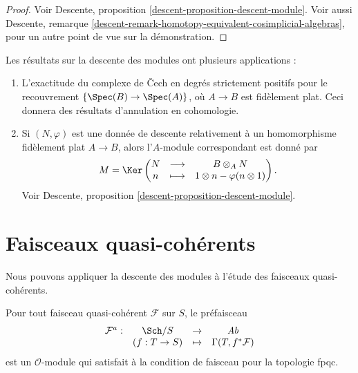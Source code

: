 \begin{proof}
Voir
Descente, proposition \ref{descent-proposition-descent-module}.
Voir aussi
Descente, remarque \ref{descent-remark-homotopy-equivalent-cosimplicial-algebras},
pour un autre point de vue sur la d\'emonstration.
\end{proof}

\begin{remarks}
\label{remarks-theorem-modules-exactness}
Les r\'esultats sur la descente des modules ont plusieurs applications :
\begin{enumerate}
\item L'exactitude du complexe de {\v C}ech en degr\'es strictement positifs pour
le recouvrement $\{\Spec(B) \to \Spec(A)\}$, o\`u $A \to B$ est
fid\`element plat. Ceci donnera des r\'esultats d'annulation en cohomologie.
\item Si $(N, \varphi)$ est une donn\'ee de descente relativement \`a un homomorphisme
fid\`element plat $A \to B$, alors l'$A$-module correspondant est donn\'e par
$$
M = \Ker \left(
\begin{matrix}
N & \longrightarrow & B \otimes_A N \\
n & \longmapsto & 1 \otimes n - \varphi(n \otimes 1)
\end{matrix}
\right).
$$
Voir
Descente, proposition \ref{descent-proposition-descent-module}.
\end{enumerate}
\end{remarks}




\section{Faisceaux quasi-coh\'erents}
\label{section-quasi-coherent}

\noindent
Nous pouvons appliquer la descente des modules \`a l'\'etude des faisceaux quasi-coh\'erents.

\begin{proposition}
\label{proposition-quasi-coherent-sheaf-fpqc}
Pour tout faisceau quasi-coh\'erent $\mathcal{F}$ sur $S$, le pr\'efaisceau
$$
\begin{matrix}
\mathcal{F}^a : & \Sch/S & \to & \textit{Ab}\\
& (f: T \to S) & \mapsto & \Gamma(T, f^*\mathcal{F})
\end{matrix}
$$
est un $\mathcal{O}$-module qui satisfait \`a la condition de faisceau pour la
topologie fpqc.
\end{proposition}

